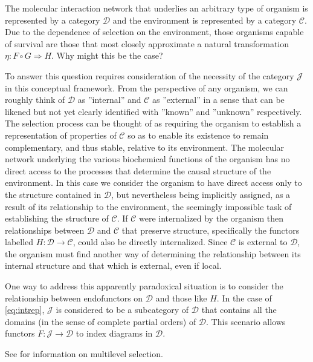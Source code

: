 \documentclass[aps,twocolumn]{revtex4}
\begin{document}
 

The molecular interaction network that underlies an arbitrary type of organism is represented by a category $\mathcal{D}$ and the environment is represented by a category $\mathcal{C}$. Due to the dependence of selection on the environment, those organisms capable of survival are those that most closely approximate a natural transformation $\eta:F \circ G \Rightarrow H$. Why might this be the case?

To answer this question requires consideration of the necessity of the category $\mathcal{J}$ in this conceptual framework. From the perspective of any organism, we can roughly think of $\mathcal{D}$ as ''internal'' and $\mathcal{C}$ as ''external'' in a sense that can be likened but not yet clearly identified with ''known'' and ''unknown'' respectively. The selection process can be thought of as requiring the organism to establish a representation of properties of $\mathcal{C}$ so as to enable its existence to remain complementary, and thus stable, relative to its environment. The molecular network underlying the various biochemical functions of the organism has no direct access to the processes that determine the causal structure of the environment. In this case we consider the organism to have direct access only to the structure contained in $\mathcal{D}$, but nevertheless being implicitly assigned, as a result of its relationship to the environment, the seemingly impossible task of establishing the structure of $\mathcal{C}$. If $\mathcal{C}$ were internalized by the organism then relationships between $\mathcal{D}$ and $\mathcal{C}$ that preserve structure, specifically the functors labelled $H:\mathcal{D} \rightarrow \mathcal{C}$, could also be directly internalized. Since $\mathcal{C}$ is external to $\mathcal{D}$, the organism must find another way of determining the relationship between its internal structure and that which is external, even if local.

One way to address this apparently paradoxical situation is to consider the relationship between endofunctors on $\mathcal{D}$ and those like $H$. In the case of \ref{eq:intrep}, $\mathcal{J}$ is considered to be a subcategory of $\mathcal{D}$ that contains all the domains (in the sense of complete partial orders) of $\mathcal{D}$. This scenario allows functors $F:\mathcal{J} \rightarrow \mathcal{D}$ to index diagrams in $\mathcal{D}$.

See \cite{Okasha2006} for information on multilevel selection.
\end{document}
